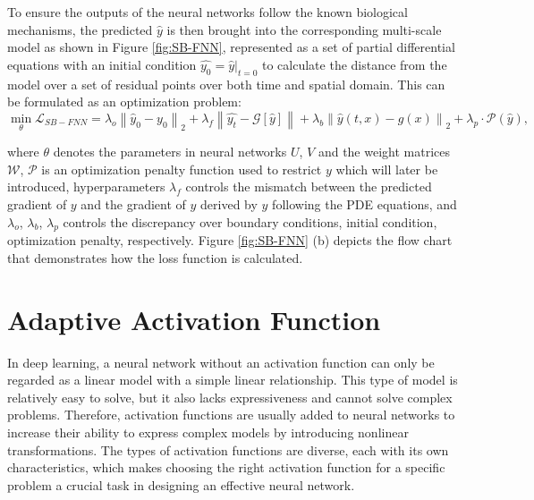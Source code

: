 To ensure the outputs of the neural networks follow the known biological mechanisms, the predicted $\widehat{y}$ is then brought into the corresponding multi-scale model as shown in Figure \ref{fig:SB-FNN}, represented as a set of partial differential equations with an initial condition $\widehat{y_0}=\widehat{y}|_{t=0}$ to calculate the distance from the model over a set of residual points over both time and spatial domain. This can be formulated as an optimization problem:
\begin{equation}
\min \limits_{\theta }\mathcal{L}_{SB-FNN} =
\lambda_{o}\left\| \widehat{y}_{0}-y_{0}\right\|_{2}
+ \lambda_{f}\left\| \widehat{y_{t}}-\mathcal{G}\left[\widehat{y}\right]\right\|
 +\lambda_{b}\left\| \widehat{y}\left(t,x\right)-g\left(x\right)\right\|_{2} 
 +\lambda_{p}\cdot \mathcal{P}\left(\widehat{y}\right),
\label{eq:loss}
\end{equation}

where $\theta$ denotes the parameters in neural networks $U$, $V$ and the weight matrices $\mathcal{W}$, $\mathcal{P}$ is an optimization penalty function used to restrict $y$ which will later be introduced, hyperparameters $\lambda_{f}$ controls the mismatch between the predicted gradient of $y$ and the gradient of $y$ derived by $\widehat{y}$ following the PDE equations, and $\lambda_{o}$, $\lambda_{b}$, $\lambda_{p}$ controls the discrepancy over boundary conditions, initial condition, optimization penalty, respectively. Figure \ref{fig:SB-FNN} (b) depicts the flow chart that demonstrates how the loss function is calculated.


\section{Adaptive Activation Function}
\label{cha:adaptive}

In deep learning, a neural network without an activation function can only be regarded as a linear model with a simple linear relationship. This type of model is relatively easy to solve, but it also lacks expressiveness and cannot solve complex problems. Therefore, activation functions are usually added to neural networks to increase their ability to express complex models by introducing nonlinear transformations. The types of activation functions are diverse, each with its own characteristics, which makes choosing the right activation function for a specific problem a crucial task in designing an effective neural network.

